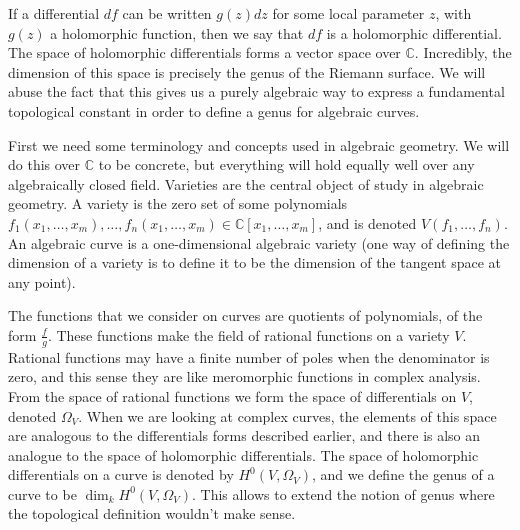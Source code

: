 \documentclass[draft, 11pt, notitlepage]{article} %
\theoremstyle{plain}
\theoremstyle{remark}
\begin{document}
If a differential $df$ can be written $g(z)dz$ for some local parameter $z$, with $g(z)$ a holomorphic function, then we say that $df$ is a holomorphic differential.
The space of holomorphic differentials forms a vector space over $\mathbb C$.
Incredibly, the dimension of this space is precisely the genus of the Riemann surface.
We will abuse the fact that this gives us a purely algebraic way to express a fundamental topological constant in order to define a genus for algebraic curves.

First we need some terminology and concepts used in algebraic geometry.
We will do this over $\mathbb C$ to be concrete, but everything will hold equally well over any algebraically closed field.
Varieties are the central object of study in algebraic geometry.
A variety is the zero set of some polynomials $f_1(x_1,\ldots, x_m), \ldots , f_n(x_1, \ldots, x_m)\in \mathbb C[x_1, \ldots, x_m]$, and is denoted 
$V(f_1, \ldots , f_n)$.
An algebraic curve is a one-dimensional algebraic variety (one way of defining the dimension of a variety is to define it to be the dimension of the tangent space at any point).

The functions that we consider on curves are quotients of polynomials, of the form $\frac{f}{g}$.
These functions make the field of rational functions on a variety $V$.
Rational functions may have a finite number of poles when the denominator is zero, and this sense they are like meromorphic functions in complex analysis.
From the space of rational functions we form the space of differentials on $V$, denoted $\Omega_V$.
When we are looking at complex curves, the elements of this space are analogous to the differentials forms described earlier, and there is also an analogue to the space of holomorphic differentials.
The space of holomorphic differentials on a curve is denoted by $H^0(V,\Omega_V)$, and we define the genus of a curve to be $\dim_k H^0(V,\Omega_V)$.
This allows to extend the notion of genus where the topological definition wouldn't make sense.
\end{document}
